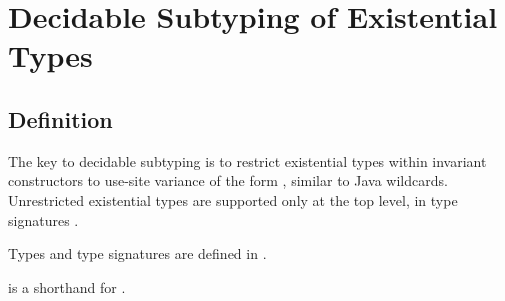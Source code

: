 \chapter{Decidable Subtyping of Existential Types}%
\label{chap:dec-sub}


\section{Definition}%
\label{sec:dec-sub:defs}


The key to decidable subtyping is to restrict existential types within
invariant constructors to use-site variance of the form
\tyinv{},
similar to Java wildcards.
Unrestricted existential types are supported only at the top level,
in type signatures \tysig.

Types and type signatures are defined in .

\tyinv{} is a shorthand for
\tyinv{}.

